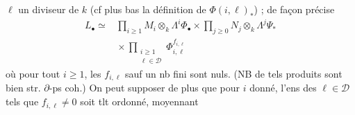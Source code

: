 
$\ell$ un  diviseur de $k$ (cf plus bas la définition de $\Phi(i,\ell)_*$) ; de façon précise
\[
\begin{aligned}
L_\bullet\simeq{}&\prod_{i\geq1}M_i\otimes_k\Lambda^i\Phi_\bullet
 \times\prod_{j\geq0}N_j\otimes_k\Lambda^j\Psi_*\\
&{}\times\prod_{\substack{i\geq1\\\ell\in\mathscr D}}\Phi_{i,\ell}^{f_{i,\ell}}
\end{aligned}
\]
où pour tout $i\geq1$,  les $f_{i,\ell}$ sauf un nb fini sont nuls. (NB de tels produits sont bien str. $\partial$-ps coh.) On peut supposer de plus que pour $i$ donné, l'ens des $\ell\in\mathscr D$  tels que $f_{i,\ell}\ne0$ soit tlt ordonné, moyennant
